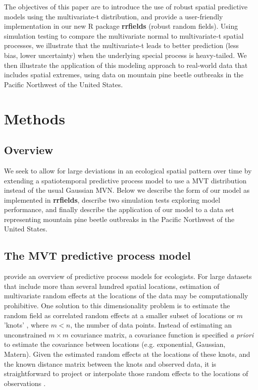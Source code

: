 \documentclass[12pt,english]{article}
\begin{document}
\begin{spacing}{1.25}
The objectives of this paper are to introduce the use of robust spatial
predictive models using the multivariate-t distribution, and provide a
user-friendly implementation in our new R package \textbf{rrfields} (robust
random fields). Using simulation testing to compare the multivariate normal to
multivariate-t spatial processes, we illustrate that the multivariate-t leads
to better prediction (less bias, lower uncertainty) when the underlying special
process is heavy-tailed. We then illustrate the application of this modeling
approach to real-world data that includes spatial extremes, using data on
mountain pine beetle outbreaks in the Pacific Northwest of the United States.

\section{Methods}

\subsection{Overview}

We seek to allow for large deviations in an ecological spatial pattern over
time by extending a spatiotemporal predictive process model to use a MVT
distribution instead of the usual Gaussian MVN. Below we describe the form of
our model as implemented in \textbf{rrfields}, describe two simulation tests
exploring model performance, and finally describe the application of our model
to a data set representing mountain pine beetle outbreaks in the Pacific
Northwest of the United States.

\subsection{The MVT predictive process model}

\citet{latimer2009} provide an overview of predictive process models for
ecologists. For large datasets that include more than several hundred spatial
locations, estimation of multivariate random effects at the locations of the
data may be computationally prohibitive. One solution to this dimensionality
problem is to estimate the random field as correlated random effects at a
smaller subset of locations or $m$ 'knots' \citep[e.g.][]{latimer2009,
  shelton2014}, where $m < n$, the number of data points. Instead of estimating
an unconstrained $m \times m$ covariance matrix, a covariance function is
specified \emph{a priori} to estimate the covariance between locations (e.g.
exponential, Gaussian, Matern). Given the estimated random effects at the
locations of these knots, and the known distance matrix between the knots and
observed data, it is straightforward to project or interpolate those random
effects to the locations of observations \citep{latimer2009, finley2009}.


\end{spacing}
\end{document}
